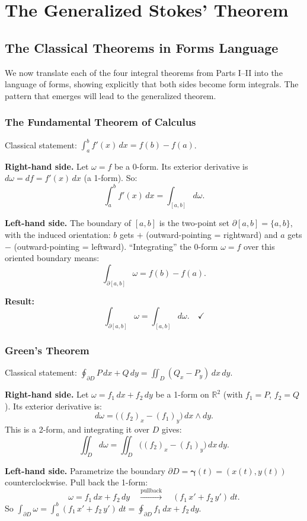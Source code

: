 \documentclass[11pt]{report}
\newcommand{\R}{\mathbb{R}}
\begin{document}
\section{The Generalized Stokes' Theorem}

\subsection{The Classical Theorems in Forms Language}

We now translate each of the four integral theorems from Parts I--II into the language of forms, showing explicitly that both sides become form integrals. The pattern that emerges will lead to the generalized theorem.

\subsubsection*{The Fundamental Theorem of Calculus}

Classical statement: $\int_a^b f'(x)\,dx = f(b) - f(a)$.

\textbf{Right-hand side.} Let $\omega = f$ be a 0-form. Its exterior derivative is $d\omega = df = f'(x)\,dx$ (a 1-form). So:
\[
\int_a^b f'(x)\,dx = \int_{[a,b]} d\omega.
\]

\textbf{Left-hand side.} The boundary of $[a,b]$ is the two-point set $\partial[a,b] = \{a, b\}$, with the induced orientation: $b$ gets $+$ (outward-pointing = rightward) and $a$ gets $-$ (outward-pointing = leftward). ``Integrating'' the 0-form $\omega = f$ over this oriented boundary means:
\[
\int_{\partial[a,b]} \omega = f(b) - f(a).
\]

\textbf{Result:}
\[
\int_{\partial[a,b]} \omega = \int_{[a,b]} d\omega. \quad \checkmark
\]

\subsubsection*{Green's Theorem}

Classical statement: $\oint_{\partial D} P\,dx + Q\,dy = \iint_D (Q_x - P_y)\,dx\,dy$.

\textbf{Right-hand side.} Let $\omega = f_1\,dx + f_2\,dy$ be a 1-form on $\R^2$ (with $f_1 = P$, $f_2 = Q$). Its exterior derivative is:
\[
d\omega = \big((f_2)_x - (f_1)_y\big)\,dx \wedge dy.
\]
This is a 2-form, and integrating it over $D$ gives:
\[
\iint_D d\omega = \iint_D \big((f_2)_x - (f_1)_y\big)\,dx\,dy.
\]

\textbf{Left-hand side.} Parametrize the boundary $\partial D = \boldsymbol{\gamma}(t) = (x(t), y(t))$ counterclockwise. Pull back the 1-form:
\[
\omega = f_1\,dx + f_2\,dy \quad \xrightarrow{\text{pullback}} \quad (f_1\,x' + f_2\,y')\,dt.
\]
So $\int_{\partial D} \omega = \int_a^b (f_1\,x' + f_2\,y')\,dt = \oint_{\partial D} f_1\,dx + f_2\,dy$.
\end{document}
